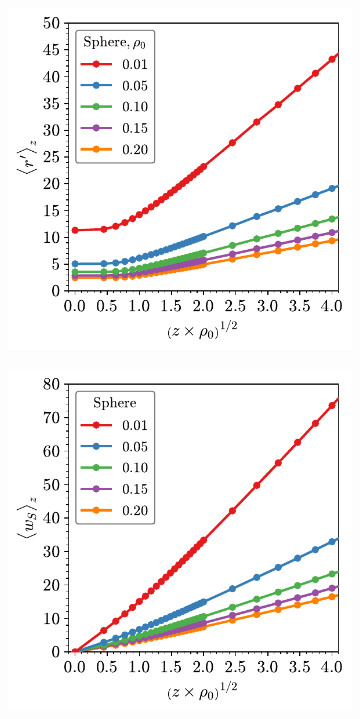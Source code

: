 \begin{figure}

	\begin{subfigure}[b]{0.45\textwidth}
         \centering
         \includegraphics[width=\textwidth]{./figures/quasi2d/d_z_3d_sphere.pdf}
         \caption{}
         \label{fig:wda}
     \end{subfigure}
     \hfill
	\begin{subfigure}[b]{0.45\textwidth}
         \centering
         \includegraphics[width=\textwidth]{./figures/quasi2d/w_z_3d_sphere.pdf}
         \caption{}
         \label{fig:wdb}
     \end{subfigure}
     \hfill     
     

\end{figure}
